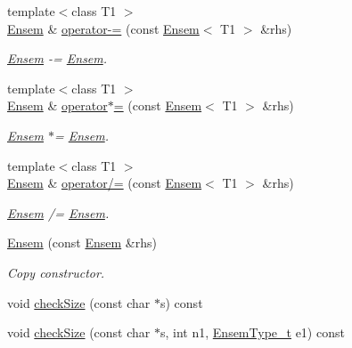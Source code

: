 \begin{DoxyCompactItemize}
{\footnotesize template$<$class T1 $>$ }\\\mbox{\hyperlink{classENSEM_1_1Ensem}{Ensem}} \& \mbox{\hyperlink{classENSEM_1_1Ensem_ae3f3e36d96a4600e56c2b139e7897186}{operator-\/=}} (const \mbox{\hyperlink{classENSEM_1_1Ensem}{Ensem}}$<$ T1 $>$ \&rhs)
\begin{DoxyCompactList}\small\item\em \mbox{\hyperlink{classENSEM_1_1Ensem}{Ensem}} -\/= \mbox{\hyperlink{classENSEM_1_1Ensem}{Ensem}}. \end{DoxyCompactList}\item 
{\footnotesize template$<$class T1 $>$ }\\\mbox{\hyperlink{classENSEM_1_1Ensem}{Ensem}} \& \mbox{\hyperlink{classENSEM_1_1Ensem_ae6590e101b18547ec3d2682ecbea0371}{operator$\ast$=}} (const \mbox{\hyperlink{classENSEM_1_1Ensem}{Ensem}}$<$ T1 $>$ \&rhs)
\begin{DoxyCompactList}\small\item\em \mbox{\hyperlink{classENSEM_1_1Ensem}{Ensem}} $\ast$= \mbox{\hyperlink{classENSEM_1_1Ensem}{Ensem}}. \end{DoxyCompactList}\item 
{\footnotesize template$<$class T1 $>$ }\\\mbox{\hyperlink{classENSEM_1_1Ensem}{Ensem}} \& \mbox{\hyperlink{classENSEM_1_1Ensem_aa0d7f0d69f4c1c1adc551c91abcf271a}{operator/=}} (const \mbox{\hyperlink{classENSEM_1_1Ensem}{Ensem}}$<$ T1 $>$ \&rhs)
\begin{DoxyCompactList}\small\item\em \mbox{\hyperlink{classENSEM_1_1Ensem}{Ensem}} /= \mbox{\hyperlink{classENSEM_1_1Ensem}{Ensem}}. \end{DoxyCompactList}\item 
\mbox{\hyperlink{classENSEM_1_1Ensem_a5e80cf6ad71f96ba2fa28cac27f06003}{Ensem}} (const \mbox{\hyperlink{classENSEM_1_1Ensem}{Ensem}} \&rhs)
\begin{DoxyCompactList}\small\item\em Copy constructor. \end{DoxyCompactList}\item 
void \mbox{\hyperlink{classENSEM_1_1Ensem_a32978c0e251d9731bdb83c6069eb059d}{check\+Size}} (const char $\ast$s) const
\item 
void \mbox{\hyperlink{classENSEM_1_1Ensem_a4c06fadea7b637572de2347739b78004}{check\+Size}} (const char $\ast$s, int n1, \mbox{\hyperlink{namespaceENSEM_a2dc2c4a26884f343471e52f23479ddbe}{Ensem\+Type\+\_\+t}} e1) const

\end{DoxyCompactItemize}
